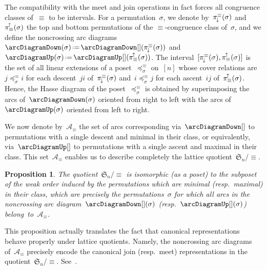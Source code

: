 \documentclass{amsart}
\newtheorem{proposition}[theorem]{Proposition}
\theoremstyle{definition}
\newcommand{\f}[1]{{\mathfrak{#1}}} %
\newcommand{\ssm}{\smallsetminus} %
\newcommand{\eqdef}{\mbox{\,\raisebox{0.2ex}{\scriptsize\ensuremath{\mathrm:}}\ensuremath{=}\,}} %
\newcommand{\arcs}{{\mathcal{A}}} %
\newcommand{\projDown}{\smash{\pi^{\equiv}_{\!\downarrow\!}}} %
\newcommand{\projUp}{\smash{\pi_{\equiv}^{\!\uparrow\!}}} %
\begin{document}
The compatibility with the meet and join operations in fact forces all congruence classes of~$\equiv$ to be intervals.
For a permutation~$\sigma$, we denote by~$\projDown(\sigma)$ and~$\projUp(\sigma)$ the top and bottom permutations of the $\equiv$-congruence class of~$\sigma$, and we define the noncrossing arc diagrams~$\arcDiagramDown(\sigma) \eqdef \arcDiagramDown[](\projDown(\sigma))$ and~$\arcDiagramUp(\sigma) \eqdef \arcDiagramUp[](\projUp(\sigma))$.
The interval~$[\projDown(\sigma), \projUp(\sigma)]$ is the set of all linear extensions of a poset~$\preccurlyeq^\equiv_\sigma$ on~$[n]$ whose cover relations are~$j \preccurlyeq^\equiv_\sigma i$ for each descent~$ji$ of~$\projDown(\sigma)$ and~$i \preccurlyeq^\equiv_\sigma j$ for each ascent~$ij$ of~$\projUp(\sigma)$.
Hence, the Hasse diagram of the poset~$\preccurlyeq^\equiv_\sigma$ is obtained by superimposing the arcs of~$\arcDiagramDown(\sigma)$ oriented from right to left with the arcs of~$\arcDiagramUp(\sigma)$ oriented from left to right.

We now denote by~$\arcs_\equiv$ the set of arcs corresponding via~$\arcDiagramDown[]$ to permutations with a single descent and minimal in their class, or equivalently, via~$\arcDiagramUp[]$ to permutations with a single ascent and maximal in their class.
This set~$\arcs_\equiv$ enables us to describe completely the lattice quotient~$\f{S}_n / {\equiv}$.

\begin{proposition}
The quotient~$\f{S}_n/{\equiv}$ is isomorphic (as a poset) to the subposet of the weak order induced by the permutations which are minimal (resp.~maximal) in their class, which are precisely the permutations~$\sigma$ for which all arcs in the noncrossing arc diagram~$\arcDiagramDown[](\sigma)$ (resp.~$\arcDiagramUp[](\sigma)$) belong~to~$\arcs_\equiv$.
\end{proposition}

This proposition actually translates the fact that canonical representations behave properly under lattice quotients.
Namely, the noncrossing arc diagrams of~$\arcs_\equiv$ precisely encode the canonical join (resp.~meet) representations in the quotient~$\f{S}_n/{\equiv}$.
See~\cite{Reading-arcDiagrams}.
\end{document}
